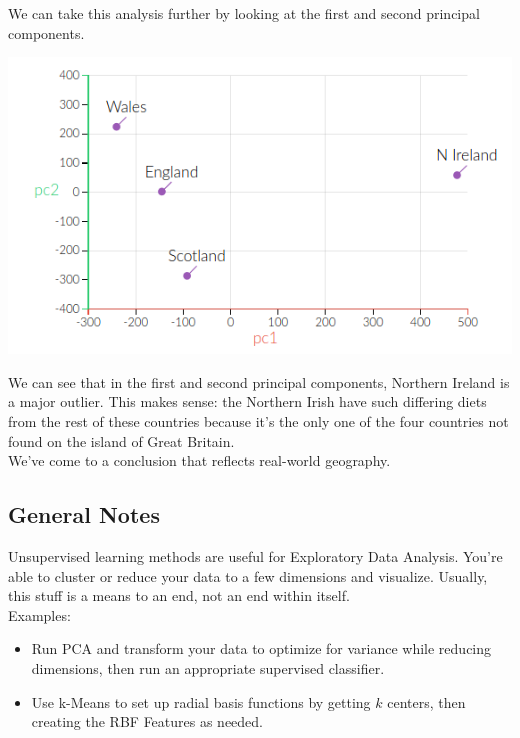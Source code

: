 \documentclass[english, 10pt]{article}
\begin{document}
\hfill \break We can take this analysis further by looking at the first and second principal components.\\

{
\centering

\includegraphics[scale=0.6]{img/17dpc2.png} 

}

\hfill \break We can see that in the first and second principal components, Northern Ireland is a major outlier. This makes sense: the Northern Irish have such differing diets from the rest of these countries because it's the only one of the four countries not found on the island of Great Britain.\\

We've come to a conclusion that reflects real-world geography.

\subsection{General Notes}

Unsupervised learning methods are useful for Exploratory Data Analysis. You're able to cluster or reduce your data to a few dimensions and visualize. Usually, this stuff is a means to an end, not an end within itself.\\

Examples:

\begin{itemize}
	\item Run PCA and transform your data to optimize for variance while reducing dimensions, then run an appropriate supervised classifier.
	\item Use k-Means to set up radial basis functions by getting $k$ centers, then creating the RBF Features as needed.
\end{itemize}
\end{document}
